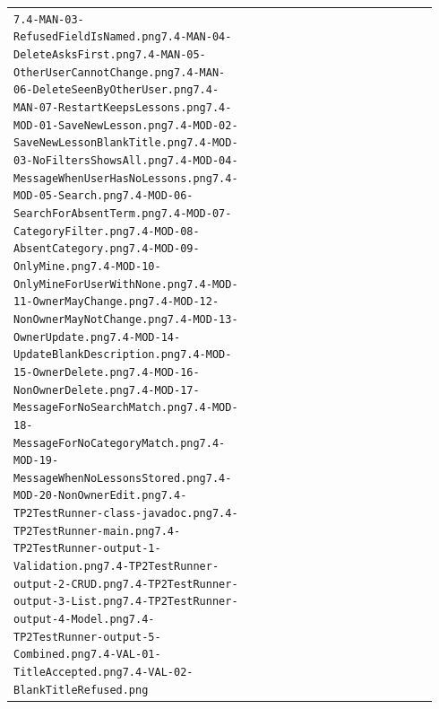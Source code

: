 \documentclass[10pt]{article}
\begin{document}
\begin{longtable}{@{}>{\raggedright\arraybackslash}p{0.07\linewidth} >{\raggedright\arraybackslash}p{0.33\linewidth} >{\raggedright\arraybackslash}p{0.54\linewidth}@{}}
\texttt{7.4-MAN-03-RefusedFieldIsNamed.png}\newline \texttt{7.4-MAN-04-DeleteAsksFirst.png}\newline \texttt{7.4-MAN-05-OtherUserCannotChange.png}\newline \texttt{7.4-MAN-06-DeleteSeenByOtherUser.png}\newline \texttt{7.4-MAN-07-RestartKeepsLessons.png}\newline \texttt{7.4-MOD-01-SaveNewLesson.png}\newline \texttt{7.4-MOD-02-SaveNewLessonBlankTitle.png}\newline \texttt{7.4-MOD-03-NoFiltersShowsAll.png}\newline \texttt{7.4-MOD-04-MessageWhenUserHasNoLessons.png}\newline \texttt{7.4-MOD-05-Search.png}\newline \texttt{7.4-MOD-06-SearchForAbsentTerm.png}\newline \texttt{7.4-MOD-07-CategoryFilter.png}\newline \texttt{7.4-MOD-08-AbsentCategory.png}\newline \texttt{7.4-MOD-09-OnlyMine.png}\newline \texttt{7.4-MOD-10-OnlyMineForUserWithNone.png}\newline \texttt{7.4-MOD-11-OwnerMayChange.png}\newline \texttt{7.4-MOD-12-NonOwnerMayNotChange.png}\newline \texttt{7.4-MOD-13-OwnerUpdate.png}\newline \texttt{7.4-MOD-14-UpdateBlankDescription.png}\newline \texttt{7.4-MOD-15-OwnerDelete.png}\newline \texttt{7.4-MOD-16-NonOwnerDelete.png}\newline \texttt{7.4-MOD-17-MessageForNoSearchMatch.png}\newline \texttt{7.4-MOD-18-MessageForNoCategoryMatch.png}\newline \texttt{7.4-MOD-19-MessageWhenNoLessonsStored.png}\newline \texttt{7.4-MOD-20-NonOwnerEdit.png}\newline \texttt{7.4-TP2TestRunner-class-javadoc.png}\newline \texttt{7.4-TP2TestRunner-main.png}\newline \texttt{7.4-TP2TestRunner-output-1-Validation.png}\newline \texttt{7.4-TP2TestRunner-output-2-CRUD.png}\newline \texttt{7.4-TP2TestRunner-output-3-List.png}\newline \texttt{7.4-TP2TestRunner-output-4-Model.png}\newline \texttt{7.4-TP2TestRunner-output-5-Combined.png}\newline \texttt{7.4-VAL-01-TitleAccepted.png}\newline \texttt{7.4-VAL-02-BlankTitleRefused.png}\newline 
\end{longtable}
\end{document}
